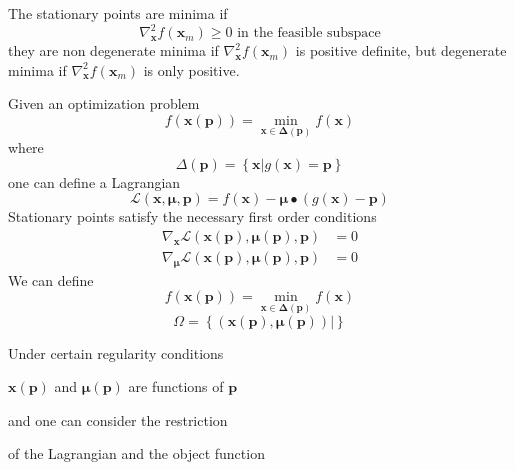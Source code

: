 \documentclass[aps,preprint]{revtex4}%
\begin{document}
The stationary points are minima if
\begin{equation}
\nabla_{\mathbf{x}}^{2}f\left(  \mathbf{x}_{m}\right)  \geq0\text{ in the
feasible subspace}%
\end{equation}
they are non degenerate minima if $\nabla_{\mathbf{x}}^{2}f\left(
\mathbf{x}_{m}\right)  $ is positive definite, but degenerate minima if
$\nabla_{\mathbf{x}}^{2}f\left(  \mathbf{x}_{m}\right)  $ is only positive.

Given an optimization problem
\[
f\left(  \mathbf{x}\left(  \mathbf{p}\right)  \right)  =\min_{\mathbf{x\in
\Delta}\left(  \mathbf{p}\right)  }f\left(  \mathbf{x}\right)
\]
where
\[
\Delta\left(  \mathbf{p}\right)  =\left\{  \left.  \mathbf{x}\right\vert
g\left(  \mathbf{x}\right)  =\mathbf{p}\right\}
\]
one can define a Lagrangian
\[
\mathcal{L}\left(  \mathbf{x,\mu,p}\right)  =f\left(  \mathbf{x}\right)
-\mathbf{\mu\bullet}\left(  g\left(  \mathbf{x}\right)  -\mathbf{p}\right)
\]
Stationary points satisfy the necessary first order conditions
\begin{align*}
\nabla_{\mathbf{x}}\mathcal{L}\left(  \mathbf{x}\left(  \mathbf{p}\right)
\mathbf{,\mu\left(  \mathbf{p}\right)  ,p}\right)   &  =0\\
\nabla_{\mathbf{\mu}}\mathcal{L}\left(  \mathbf{x\left(  \mathbf{p}\right)
,\mu\left(  \mathbf{p}\right)  ,p}\right)   &  =0
\end{align*}
We can define
\[
f\left(  \mathbf{x}\left(  \mathbf{p}\right)  \right)  =\min_{\mathbf{x\in
\Delta}\left(  \mathbf{p}\right)  }f\left(  \mathbf{x}\right)
\]%
\begin{equation}
\Omega=\left\{  \left.  \left(  \mathbf{x\left(  \mathbf{p}\right)
,\mu\left(  \mathbf{p}\right)  }\right)  \right\vert \right\}
\end{equation}


Under certain regularity conditions

$\mathbf{x\left(  \mathbf{p}\right)  }$ and $\mathbf{\mu\left(  \mathbf{p}%
\right)  }$ are functions of $\mathbf{p}$

and one can consider the restriction

of the Lagrangian and the object function 
\end{document}
